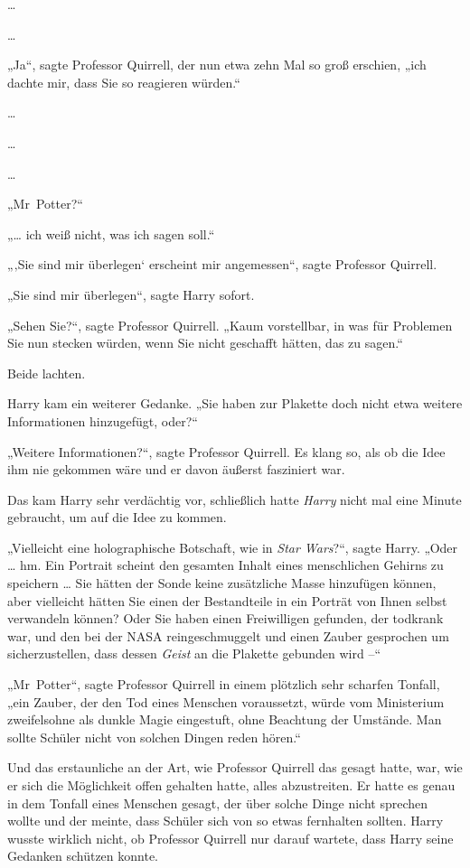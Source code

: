 {…

…

„Ja“, sagte Professor Quirrell, der nun etwa zehn Mal so groß erschien, „ich dachte mir, dass Sie so reagieren würden.“

…

…

…

„Mr~Potter?“

„… ich weiß nicht, was ich sagen soll.“

„‚Sie sind mir überlegen` erscheint mir angemessen“, sagte Professor Quirrell.

„Sie sind mir überlegen“, sagte Harry sofort.

„Sehen Sie?“, sagte Professor Quirrell. „Kaum vorstellbar, in was für Problemen Sie nun stecken würden, wenn Sie nicht geschafft hätten, das zu sagen.“

Beide lachten.

Harry kam ein weiterer Gedanke. „Sie haben zur Plakette doch nicht etwa weitere Informationen hinzugefügt, oder?“

„Weitere Informationen?“, sagte Professor Quirrell. Es klang so, als ob die Idee ihm nie gekommen wäre und er davon äußerst fasziniert war.

Das kam Harry sehr verdächtig vor, schließlich hatte \emph{Harry} nicht mal eine Minute gebraucht, um auf die Idee zu kommen.

„Vielleicht eine holographische Botschaft, wie in \emph{Star Wars}?“, sagte Harry. „Oder … hm. Ein Portrait scheint den gesamten Inhalt eines menschlichen Gehirns zu speichern … Sie hätten der Sonde keine zusätzliche Masse hinzufügen können, aber vielleicht hätten Sie einen der Bestandteile in ein Porträt von Ihnen selbst verwandeln können? Oder Sie haben einen Freiwilligen gefunden, der todkrank war, und den bei der NASA reingeschmuggelt und einen Zauber gesprochen um sicherzustellen, dass dessen \emph{Geist} an die Plakette gebunden wird --“

„Mr~Potter“, sagte Professor Quirrell in einem plötzlich sehr scharfen Tonfall, „ein Zauber, der den Tod eines Menschen voraussetzt, würde vom Ministerium zweifelsohne als dunkle Magie eingestuft, ohne Beachtung der Umstände. Man sollte Schüler nicht von solchen Dingen reden hören.“

Und das erstaunliche an der Art, wie Professor Quirrell das gesagt hatte, war, wie er sich die Möglichkeit offen gehalten hatte, alles abzustreiten. Er hatte es genau in dem Tonfall eines Menschen gesagt, der über solche Dinge nicht sprechen wollte und der meinte, dass Schüler sich von so etwas fernhalten sollten. Harry wusste wirklich nicht, ob Professor Quirrell nur darauf wartete, dass Harry seine Gedanken schützen konnte.

}
